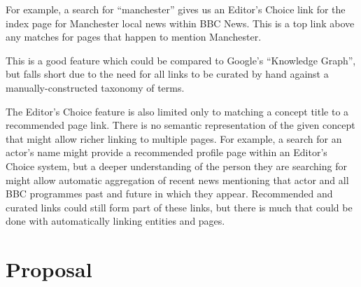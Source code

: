 \documentclass[10pt,a4paper]{article}
\begin{document}
For example, a search for ``manchester'' gives
us an Editor's Choice link for the index page for Manchester local
news within BBC News. This is a top link above any matches for pages
that happen to mention Manchester.

This is a good feature which could be compared to Google's
``Knowledge Graph'', but falls short due to the need for all links
to be curated by hand against a manually-constructed taxonomy of terms.

The Editor's Choice feature is also limited only to matching a
concept title to a recommended page link. There is no semantic
representation of the given concept that might allow richer linking
to multiple pages. For example, a search for an actor's name might
provide a recommended profile page within an Editor's Choice system,
but a deeper understanding of the person they are searching for might
allow automatic aggregation of recent news mentioning that actor and
all BBC programmes past and future in which they appear. Recommended
and curated links could still form part of these links, but there
is much that could be done with automatically linking entities and pages.

\section{Proposal}
\end{document}

